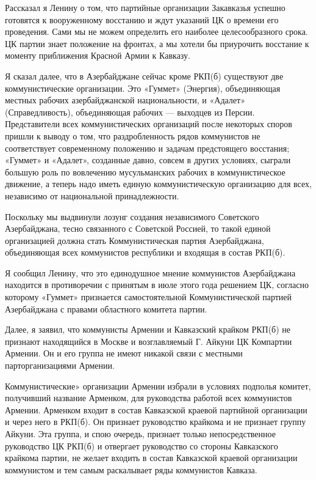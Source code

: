 \documentclass[12pt, a4paper, openany]{book}
\begin{document}
Рассказал я Ленину о том, что партийные организации Закавказья успешно готовятся к вооруженному восстанию и ждут указаний ЦК о времени его проведения. Сами мы не можем определить его наиболее целесообразного срока. ЦК партии знает положение на фронтах, а мы хотели бы приурочить восстание к моменту приближения Красной Армии к Кавказу.

Я сказал далее, что в Азербайджане сейчас кроме РКП(б) существуют две коммунистические организации. Это «Гуммет» (Энергия), объединяющая местных рабочих азербайджанской национальности, и «Адалет» (Справедливость), объединяющая рабочих — выходцев из Персии. Представители всех коммунистических организаций после некоторых споров пришли к выводу о том, что раздробленность рядов коммунистов не соответствует современному положению и задачам предстоящего восстания; «Гуммет» и «Адалет», созданные давно, совсем в других условиях, сыграли большую роль по вовлечению мусульманских рабочих в коммунистическое движение, а теперь надо иметь единую коммунистическую организацию для всех, независимо от национальной принадлежности.

Поскольку мы выдвинули лозунг создания независимого Советского Азербайджана, тесно связанного с Советской Россией, то такой единой организацией должна стать Коммунистическая партия Азербайджана, объединяющая всех коммунистов республики и входящая в состав РКП(б).

Я сообщил Ленину, что это единодушное мнение коммунистов Азербайджана находится в противоречии с принятым в июле этого года решением ЦК, согласно которому «Гуммет» признается самостоятельной Коммунистической партией Азербайджана с правами областного комитета партии.

Далее, я заявил, что коммунисты Армении и Кавказский крайком РКП(б) не признают находящийся в Москве и возглавляемый Г. Айкуни ЦК Компартии Армении. Он и его группа не имеют никакой связи с местными парторганизациями Армении.

Коммунистические» организации Армении избрали в условиях подполья комитет, получивший название Арменком, для руководства работой всех коммунистов Армении. Арменком входит в состав Кавказской краевой партийной организации и через него в РКП(б). Он признает руководство крайкома и не признает группу Айкуни. Эта группа, и спою очередь, признает только непосредственное руководство ЦК РКП(б) и отвергает руководство со стороны Кавказского крайкома партии, не желает входить в состав Кавказской краевой организации коммунистом и тем самым раскалывает ряды коммунистов Кавказа.
\end{document}
